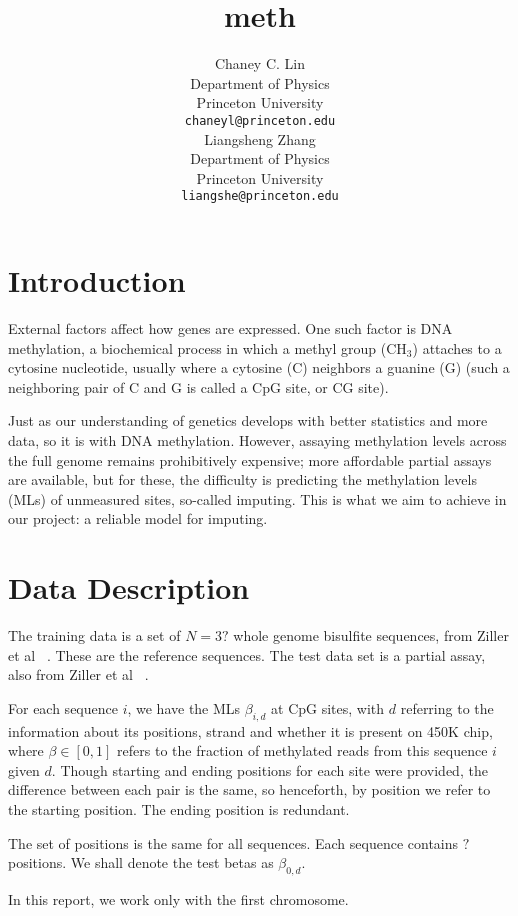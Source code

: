 \documentclass{article} %
\title{meth}
\author{
Chaney C. Lin\\
Department of Physics\\
Princeton University\\
\texttt{chaneyl@princeton.edu} \\
\And
Liangsheng Zhang\\
Department of Physics\\
Princeton University\\
\texttt{liangshe@princeton.edu} \\
}
\begin{document}
\maketitle

\begin{abstract}
\end{abstract}
\section{Introduction}

External factors affect how genes are expressed. One such factor is DNA methylation, a biochemical process in which a methyl group (CH$_3$) attaches to a cytosine nucleotide, usually where a cytosine (C) neighbors a guanine (G) (such a neighboring pair of C and G is called a CpG site, or CG site).

Just as our understanding of genetics develops with better statistics and more data, so it is with DNA methylation. However, assaying methylation levels across the full genome remains prohibitively expensive; more affordable partial assays are available, but for these, the difficulty is predicting the methylation levels (MLs) of unmeasured sites, so-called imputing. This is what we aim to achieve in our project: a reliable model for imputing.

\section{Data Description}

The training data is a set of $N = 3?$ whole genome bisulfite sequences, from Ziller et al ~\cite{ziller2013charting}. These are the reference sequences. The test data set is a partial assay, also from Ziller et al ~\cite{ziller2013charting}.

For each sequence $i$, we have the MLs $\beta_{i,d}$ at CpG sites, with $d$ referring to the information about its positions, strand and whether it is present on 450K chip, where $\beta \in [0,1]$ refers to the fraction of methylated reads from this sequence $i$ given $d$. Though starting and ending positions for each site were provided, the difference between each pair is the same, so henceforth, by position we refer to the starting position. The ending position is redundant.

The set of positions is the same for all sequences. Each sequence contains $?$ positions. We shall denote the test betas as $\beta_{0,d}$.

In this report, we work only with the first chromosome.
\end{document}
